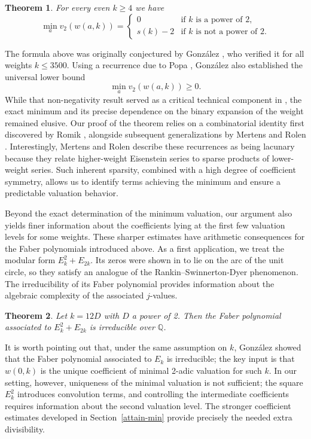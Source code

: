 \documentclass[12pt]{amsart}
\newtheorem{theorem}{Theorem}
\begin{document}
\begin{theorem} \label{MainResult}
For every even $k \ge 4$ we have
\[
\min_a  v_2 \left( w(a,k) \right) =
\begin{cases}
0 & \text{if $k$ is a power of 2},\\
s(k)-2 & \text{if $k$ is not a power of 2}.
\end{cases}
\]
\end{theorem}
\noindent The formula above was originally conjectured by Gonz\'alez \cite[Conj. 8]{Gonz}, who verified it for all weights $k\le 3500$. Using a recurrence due to Popa \cite{Popa}, Gonz\'alez also established the universal lower bound \[\min_a  v_2 \left( w(a,k) \right)\ge 0.\] While that non-negativity result served as a critical technical component in \cite{Gonz}, the exact minimum and its precise dependence on the binary expansion of the weight remained elusive. Our proof of the theorem relies on a combinatorial identity first discovered by Romik \cite{Romik}, alongside subsequent generalizations by Mertens and Rolen \cite{MerRol}. Interestingly, Mertens and Rolen describe these recurrences as being lacunary because they relate higher-weight Eisenstein series to sparse products of lower-weight series. Such inherent sparsity, combined with a high degree of coefficient symmetry, allows us to identify terms achieving the minimum and ensure a predictable valuation behavior. 

Beyond the exact determination of the minimum valuation, our argument also yields finer information about the coefficients lying at the first few valuation levels for some weights. These sharper estimates have arithmetic
consequences for the Faber polynomials introduced above. As a first application, we treat the modular form $E_k^2+E_{2k}$. Its zeros were shown in \cite{klangwang} to lie on the arc of the unit circle, so they satisfy an analogue of the Rankin--Swinnerton-Dyer phenomenon. The irreducibility of its Faber polynomial provides information about the algebraic complexity of the associated $j$-values.

\begin{theorem} \label{FaberIrred}
Let $k=12D$ with $D$ a power of 2. Then the Faber polynomial associated to $E_k^2+E_{2k}$ is irreducible over $\mathbb{Q}$. 
\end{theorem}

It is worth pointing out that, under the same assumption on $k$, Gonz\'alez \cite[Thm. 1]{Gonz} showed that the Faber polynomial associated to $E_k$ is irreducible; the key input is that $w(0,k)$ is the unique coefficient of minimal 2-adic valuation for such $k$. In our setting, however, uniqueness of the minimal valuation is not sufficient; the square $E_k^2$ introduces convolution terms, and controlling the intermediate coefficients requires information about the second valuation level. The stronger coefficient estimates developed in Section~\ref{attain-min} provide precisely the needed extra divisibility. 
\end{document}
